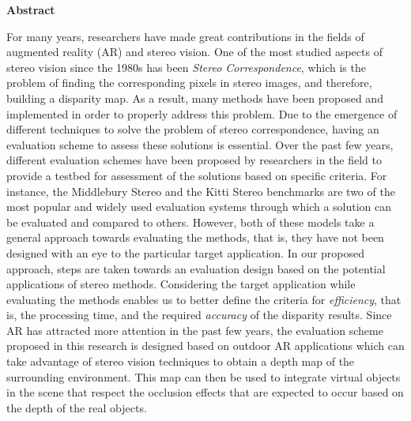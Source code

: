 \begin{center}
\textbf{\large Abstract}
\end{center}
For many years, researchers have made great contributions in the fields of augmented reality (AR) and stereo vision. 
One of the most studied aspects of stereo vision since the 1980s has been \textit{Stereo Correspondence}, which is the problem of 
finding the corresponding pixels in stereo images, and therefore, building a disparity map.
As a result, many methods have been proposed and implemented in order to properly address this problem. 
Due to the emergence of different techniques to solve the problem of stereo correspondence, having an evaluation scheme to assess 
these solutions is essential. Over the past few years, different evaluation schemes have been proposed 
by researchers in the field to provide a testbed for assessment of the solutions based on specific criteria.
For instance, the Middlebury Stereo and the Kitti Stereo benchmarks
are two of the most popular and widely used evaluation systems through which a solution can be evaluated and compared 
to others. 
However, both of these models take a general approach towards evaluating the methods, that is, they 
have not been designed with an eye to the particular target application.
In our proposed approach, steps are taken towards an evaluation design based on the potential applications of stereo methods.
Considering the target application while evaluating the methods enables us to better define the criteria for \textit{efficiency}, that is, the processing time, 
and the required \textit{accuracy} of the disparity results.
Since AR has attracted more attention in the past few years, 
the evaluation scheme proposed in this research is designed based on outdoor AR applications which can take advantage of
stereo vision techniques to obtain a depth map of the surrounding environment. This map can then be used to
integrate virtual objects in the scene that respect the occlusion effects that are expected to occur based on the depth of the real objects. 

